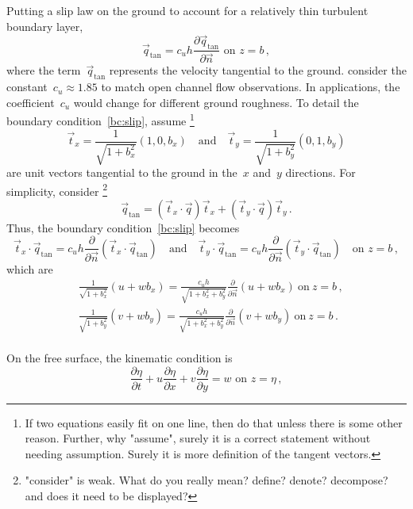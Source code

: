 \documentclass[12pt,a5paper]{article}
\begin{document}
Putting a slip law on the ground to account for a relatively thin turbulent boundary layer, 
\begin{equation}
\vec q_{\text{tan}}=c_uh\frac{\partial\vec q_{\text{tan}}}{\partial\vec n} \text{ on } z=b\,,
\label{bc:slip}
\end{equation} 
where the term~$\vec q_{\text{tan}}$ represents the velocity tangential to the ground. \cite{Roberts2008} consider the constant~$c_u\approx1.85$ to match open channel flow observations. In applications, the coefficient~$c_u$ would change for different ground roughness. To detail the boundary condition~\eqref{bc:slip}, assume
\footnote{If two equations easily fit on one line, then do that unless there is some other reason.  Further, why "assume", surely it is a correct statement without needing assumption.  Surely it is more definition of the tangent vectors.}
\begin{equation*}
\vec t_x=\frac{1}{\sqrt{1+b_x^2}}(1,0,b_x)
\quad\text{and}\quad
\vec t_y=\frac{1}{\sqrt{1+b_y^2}}(0,1,b_y)
\end{equation*}
are unit vectors tangential to the ground in the~$x$ and~$y$ directions. 
For simplicity, consider
\footnote{"consider" is weak.  What do you really mean?  define? denote? decompose? and does it need to be displayed?}
\begin{equation*}
\vec q_{\text{tan}}=(\vec t_x\cdot\vec q)\vec t_x+(\vec t_y\cdot\vec q)\vec t_y\,.
\end{equation*}
Thus, the boundary condition~\eqref{bc:slip} becomes
\begin{equation*}
\vec t_x\cdot\vec q_{\text{tan}}=c_uh\frac{\partial}{\partial\vec n}(\vec t_x\cdot\vec q_{\text{tan}})
\quad\text{and}\quad
\vec t_y\cdot\vec q_{\text{tan}}=c_uh\frac{\partial}{\partial\vec n}(\vec t_y\cdot\vec q_{\text{tan}}) \quad\text{on } z=b\,,
\end{equation*}
which are
\begin{align}&
\frac{1}{\sqrt{1+b_x^2}}(u+wb_x)=\frac{c_uh}{\sqrt{1+b_x^2+b_y^2}}\frac{\partial}{\partial\vec n}(u+wb_x)\ \text{on}\ z=b\,,\label{slip:u}\\&
\frac{1}{\sqrt{1+b_y^2}}(v+wb_y)=\frac{c_uh}{\sqrt{1+b_x^2+b_y^2}}\frac{\partial}{\partial\vec n}(v+wb_y)\ \text{on}\ z=b\,.\label{slip:v}
\end{align}
\\
On the free surface, the kinematic condition is 
\begin{equation}
 \frac{\partial\eta}{\partial t}+u\frac{\partial\eta}{\partial x}+v\frac{\partial\eta}{\partial y}=w \text{ on } z=\eta\,,
\end{equation}
\end{document}
